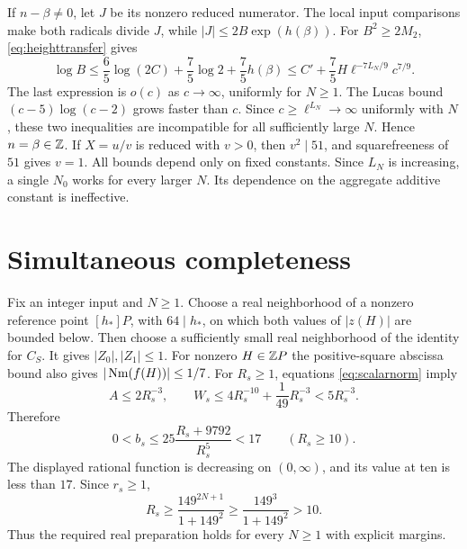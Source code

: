 \documentclass[11pt,a4paper]{article}
\begin{document}
If $n-\beta\ne0$, let $J$ be its nonzero reduced numerator.
The local input comparisons make both radicals divide $J$,
while $|J|\le2B\exp(h(\beta))$. For $B^2\ge2M_2$,
\eqref{eq:heighttransfer} gives
\[
 \log B\le\frac65\log(2C)+\frac75\log2+\frac75h(\beta)
 \le C'+\frac75H\ell^{-7L_N/9}c^{7/9}.
\]
The last expression is $o(c)$ as $c\to\infty$, uniformly for
$N\ge1$. The Lucas bound $(c-5)\log(c-2)$ grows faster than $c$.
Since $c\ge\ell^{L_N}\to\infty$ uniformly with $N$, these two
inequalities are incompatible for all sufficiently large $N$.
Hence $n=\beta\in\mathbb Z$. If $X=u/v$ is reduced with $v>0$, then
$v^2\mid51$, and squarefreeness of $51$ gives $v=1$.
All bounds depend only on fixed constants. Since $L_N$ is increasing,
a single $N_0$ works for every larger $N$. Its dependence on the
aggregate additive constant is ineffective.

\section{Simultaneous completeness}
Fix an integer input and $N\ge1$. Choose a real neighborhood of a
nonzero reference point $[h_*]P$, with $64\mid h_*$, on which
both values of $|z(H)|$ are bounded below. Then choose a sufficiently
small real neighborhood of the identity for $C_S$. It gives
$|Z_0|,|Z_1|\le1$. For nonzero $H\in\mathbb Z P$ the positive-square
abscissa bound also gives $|\operatorname{Nm}(f(H))|\le1/7$.
For $R_s\ge1$, equations \eqref{eq:scalarnorm} imply
\[
 A\le2R_s^{-3},\qquad
 W_s\le4R_s^{-10}+\frac1{49}R_s^{-3}<5R_s^{-3}.
\]
Therefore
\[
 0<b_s\le25\frac{R_s+9792}{R_s^5}<17\qquad(R_s\ge10).
\]
The displayed rational function is decreasing on $(0,\infty)$, and
its value at ten is less than $17$. Since $r_s\ge1$,
\[
 R_s\ge\frac{149^{2N+1}}{1+149^2}
       \ge\frac{149^3}{1+149^2}>10.
\]
Thus the required real preparation holds for every $N\ge1$ with
explicit margins.
\end{document}
